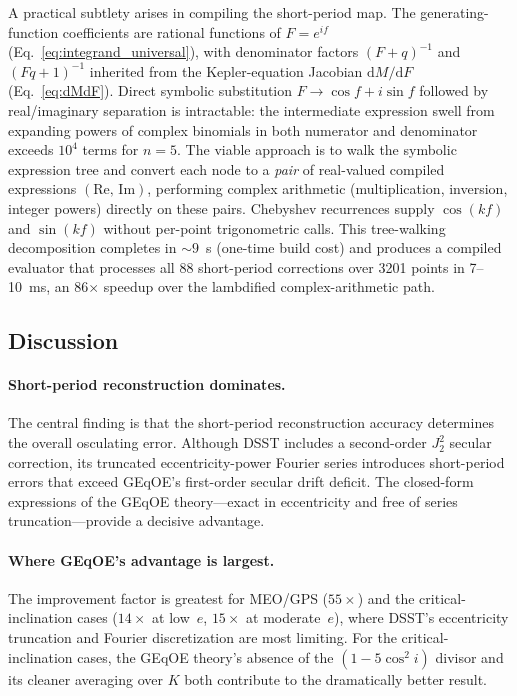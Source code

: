 \documentclass[11pt]{article}
\begin{document}
A practical subtlety arises in compiling the short-period map.
The generating-function coefficients are rational functions of $F =
e^{if}$ (Eq.~\ref{eq:integrand_universal}), with denominator factors
$(F + q)^{-1}$ and $(Fq + 1)^{-1}$ inherited from the Kepler-equation
Jacobian $\mathrm{d}M/\mathrm{d}F$ (Eq.~\ref{eq:dMdF}).
Direct symbolic substitution $F \to \cos f + i\sin f$ followed by
real/imaginary separation is intractable: the intermediate expression
swell from expanding powers of complex binomials in both numerator and
denominator exceeds $10^4$ terms for $n=5$.
The viable approach is to walk the symbolic expression tree and convert
each node to a \emph{pair} of real-valued compiled expressions
$(\mathrm{Re},\,\mathrm{Im})$, performing complex arithmetic
(multiplication, inversion, integer powers) directly on these pairs.
Chebyshev recurrences supply $\cos(kf)$ and $\sin(kf)$ without
per-point trigonometric calls.
This tree-walking decomposition completes in ${\sim}9$~s (one-time
build cost) and produces a compiled evaluator that processes all 88
short-period corrections over 3201 points in 7--10~ms, an 86$\times$
speedup over the lambdified complex-arithmetic path.

\subsection{Discussion}

\paragraph{Short-period reconstruction dominates.}
The central finding is that the short-period reconstruction accuracy
determines the overall osculating error.
Although DSST includes a second-order $J_2^2$ secular correction,
its truncated eccentricity-power Fourier series introduces
short-period errors that exceed GEqOE's first-order secular drift deficit.
The closed-form expressions of the GEqOE theory---exact in
eccentricity and free of series truncation---provide a decisive advantage.

\paragraph{Where GEqOE's advantage is largest.}
The improvement factor is greatest for MEO/GPS ($55\times$) and the
critical-inclination cases ($14\times$ at low~$e$, $15\times$ at
moderate~$e$), where DSST's eccentricity truncation and Fourier
discretization are most limiting.
For the critical-inclination cases, the GEqOE theory's absence of the
$(1-5\cos^2 i)$ divisor and its cleaner averaging over $K$ both contribute
to the dramatically better result.
\end{document}
